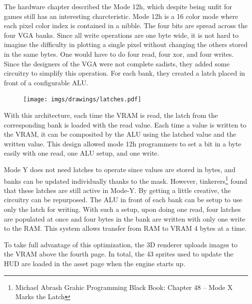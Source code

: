The hardware chapter described the Mode 12h, which despite being unfit for games still has an interesting charcteristic. Mode 12h is a 16 color mode where each pixel color index is contained in a nibble. The four bits are spread across the four VGA banks. Since all write operations are one byte wide, it is not hard to imagine the difficulty in plotting a single pixel without changing the others stored in the same bytes. One would have to do four read, four xor, and four writes. Since the designers of the VGA were not complete sadists, they added some circuitry to simplify this operation. For each bank, they created a latch placed in front of a configurable ALU.\\
\par
 \begin{figure}[H]
\centering
 \texttt{[image: imgs/drawings/latches.pdf]}
 \end{figure}
With this architecture, each time the VRAM is read, the latch from the corresponding bank is loaded with the read value. Each time a value is written to the VRAM, it can be composited by the ALU using the latched value and the written value. This design allowed mode 12h programmers to set a bit in a byte easily with one read, one ALU setup, and one write.\\
\par
Mode Y does not need latches to operate since values are stored in bytes, and banks can be updated individually thanks to the mask. However, tinkerers\footnote{Michael Abrash Grahic Programming Black Book: Chapter 48 -- Mode X Marks the Latch} found that these latches are still active in  Mode-Y. By getting a little creative, the circuitry can be repurposed. The ALU in front of each bank can be setup to use only the latch for writing. With such a setup, upon doing one read, four latches are populated at once and four bytes in the bank are written with only one write to the RAM. This system allows transfer from RAM to VRAM 4 bytes at a time.\\
\par
To take full advantage of this optimization, the 3D renderer uploads images to the VRAM above the fourth page. In total, the 43 sprites used to update the HUD are loaded in the asset page when the engine starts up.\\

\begin{minipage}{.23\textwidth}
  \end{minipage}
\begin{minipage}{.23\textwidth}
  \end{minipage}
\begin{minipage}{.23\textwidth}
  \end{minipage}
\begin{minipage}{.23\textwidth}
  \end{minipage}
\par


